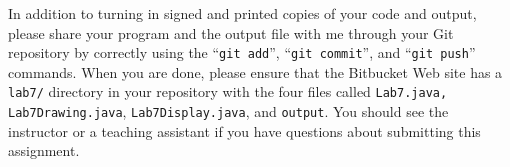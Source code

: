 In addition to turning in signed and printed copies of your code and output, please share your program and the output
file with me through your Git repository by correctly using the ``{\tt git add}'', ``{\tt git commit}'', and ``{\tt git
push}'' commands. When you are done, please ensure that the Bitbucket Web site has a {\tt lab7/} directory in your
repository with the four files called {\tt Lab7.java, Lab7Drawing.java}, {\tt Lab7Display.java}, and {\tt output}. You
should see the instructor or a teaching assistant if you have questions about submitting this assignment.



